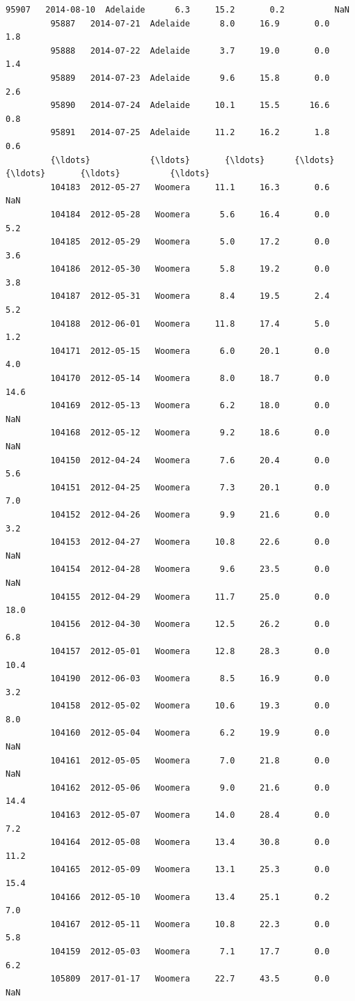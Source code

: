 \documentclass[11pt]{article}
\begin{document}
\begin{Verbatim}[commandchars=\\\{\}]
         95907   2014-08-10  Adelaide      6.3     15.2       0.2          NaN   
         95887   2014-07-21  Adelaide      8.0     16.9       0.0          1.8   
         95888   2014-07-22  Adelaide      3.7     19.0       0.0          1.4   
         95889   2014-07-23  Adelaide      9.6     15.8       0.0          2.6   
         95890   2014-07-24  Adelaide     10.1     15.5      16.6          0.8   
         95891   2014-07-25  Adelaide     11.2     16.2       1.8          0.6   
         {\ldots}            {\ldots}       {\ldots}      {\ldots}      {\ldots}       {\ldots}          {\ldots}   
         104183  2012-05-27   Woomera     11.1     16.3       0.6          NaN   
         104184  2012-05-28   Woomera      5.6     16.4       0.0          5.2   
         104185  2012-05-29   Woomera      5.0     17.2       0.0          3.6   
         104186  2012-05-30   Woomera      5.8     19.2       0.0          3.8   
         104187  2012-05-31   Woomera      8.4     19.5       2.4          5.2   
         104188  2012-06-01   Woomera     11.8     17.4       5.0          1.2   
         104171  2012-05-15   Woomera      6.0     20.1       0.0          4.0   
         104170  2012-05-14   Woomera      8.0     18.7       0.0         14.6   
         104169  2012-05-13   Woomera      6.2     18.0       0.0          NaN   
         104168  2012-05-12   Woomera      9.2     18.6       0.0          NaN   
         104150  2012-04-24   Woomera      7.6     20.4       0.0          5.6   
         104151  2012-04-25   Woomera      7.3     20.1       0.0          7.0   
         104152  2012-04-26   Woomera      9.9     21.6       0.0          3.2   
         104153  2012-04-27   Woomera     10.8     22.6       0.0          NaN   
         104154  2012-04-28   Woomera      9.6     23.5       0.0          NaN   
         104155  2012-04-29   Woomera     11.7     25.0       0.0         18.0   
         104156  2012-04-30   Woomera     12.5     26.2       0.0          6.8   
         104157  2012-05-01   Woomera     12.8     28.3       0.0         10.4   
         104190  2012-06-03   Woomera      8.5     16.9       0.0          3.2   
         104158  2012-05-02   Woomera     10.6     19.3       0.0          8.0   
         104160  2012-05-04   Woomera      6.2     19.9       0.0          NaN   
         104161  2012-05-05   Woomera      7.0     21.8       0.0          NaN   
         104162  2012-05-06   Woomera      9.0     21.6       0.0         14.4   
         104163  2012-05-07   Woomera     14.0     28.4       0.0          7.2   
         104164  2012-05-08   Woomera     13.4     30.8       0.0         11.2   
         104165  2012-05-09   Woomera     13.1     25.3       0.0         15.4   
         104166  2012-05-10   Woomera     13.4     25.1       0.2          7.0   
         104167  2012-05-11   Woomera     10.8     22.3       0.0          5.8   
         104159  2012-05-03   Woomera      7.1     17.7       0.0          6.2   
         105809  2017-01-17   Woomera     22.7     43.5       0.0          NaN   
         

\end{Verbatim}
\end{document}
